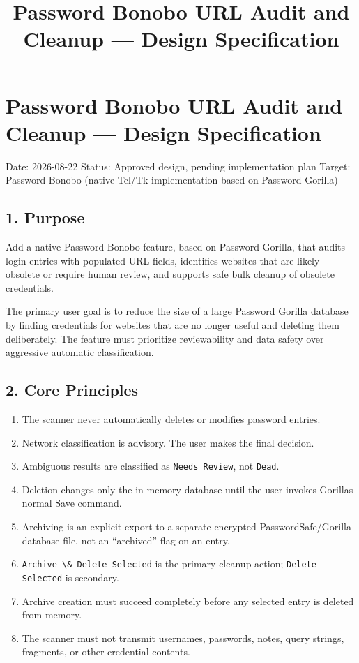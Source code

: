 \documentclass[
  letterpaper,
]{article}
\title{Password Bonobo URL Audit and Cleanup --- Design Specification}
\author{}
\date{}
\newcommand{\passthrough}[1]{#1}
\providecommand{\tightlist}{%
  \setlength{\itemsep}{0pt}\setlength{\parskip}{0pt}}
\begin{document}
\maketitle

{
\setcounter{tocdepth}{3}
\tableofcontents
}
\section{Password Bonobo URL Audit and Cleanup --- Design
Specification}\label{password-bonobo-url-audit-and-cleanup--design-specification}

Date: 2026-08-22 Status: Approved design, pending implementation plan Target: Password Bonobo (native Tcl/Tk
implementation based on Password Gorilla)

\subsection{1. Purpose}\label{1-purpose}

Add a native Password Bonobo feature, based on Password Gorilla, that audits login entries with populated URL fields,
identifies websites that are likely obsolete or require human review, and supports safe bulk cleanup of obsolete
credentials.

The primary user goal is to reduce the size of a large Password Gorilla database by finding credentials for websites
that are no longer useful and deleting them deliberately. The feature must prioritize reviewability and data safety over
aggressive automatic classification.

\subsection{2. Core Principles}\label{2-core-principles}

\begin{enumerate}
\def\labelenumi{\arabic{enumi}.}
\tightlist
\item
  The scanner never automatically deletes or modifies password entries.
\item
  Network classification is advisory. The user makes the final decision.
\item
  Ambiguous results are classified as \passthrough{\lstinline!Needs Review!}, not \passthrough{\lstinline!Dead!}.
\item
  Deletion changes only the in-memory database until the user invokes Gorilla\textquotesingle s normal Save command.
\item
  Archiving is an explicit export to a separate encrypted PasswordSafe/Gorilla database file, not an ``archived'' flag
  on an entry.
\item
  \passthrough{\lstinline!Archive \& Delete Selected!} is the primary cleanup action;
  \passthrough{\lstinline!Delete Selected!} is secondary.
\item
  Archive creation must succeed completely before any selected entry is deleted from memory.
\item
  The scanner must not transmit usernames, passwords, notes, query strings, fragments, or other credential contents.
\end{enumerate}
\end{document}

